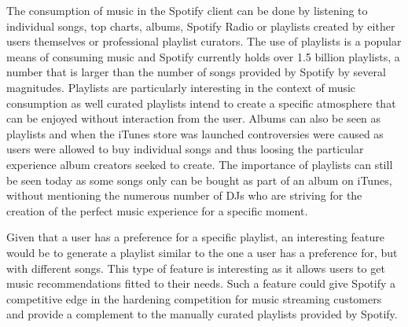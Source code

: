 \documentclass[a4paper,11pt]{kth-mag}
\begin{document}
The consumption of music in the Spotify client can be done by listening to individual songs, top charts, albums, Spotify Radio or playlists created by either users themselves or professional playlist curators. The use of playlists is a popular means of consuming music and Spotify currently holds over 1.5 billion playlists, a number that is larger than the number of songs provided by Spotify by several magnitudes\cite{spotifyPress}. Playlists are particularly interesting in the context of music consumption as well curated playlists intend to create a specific atmosphere that can be enjoyed without interaction from the user. Albums can also be seen as playlists and when the iTunes store was launched controversies were caused as users were allowed to buy individual songs and thus loosing the particular experience album creators seeked to create. The importance of playlists can still be seen today as some songs only can be bought as part of an album on iTunes, without mentioning the numerous number of DJs who are striving for the creation of the perfect music experience for a specific moment. 

Given that a user has a preference for a specific playlist, an interesting feature would be to generate a playlist similar to the one a user has a preference for, but with different songs. This type of feature is interesting as it allows users to get music recommendations fitted to their needs. Such a feature could give Spotify a competitive edge in the hardening competition for music streaming customers and provide a complement to the manually curated playlists provided by Spotify.
\end{document}
